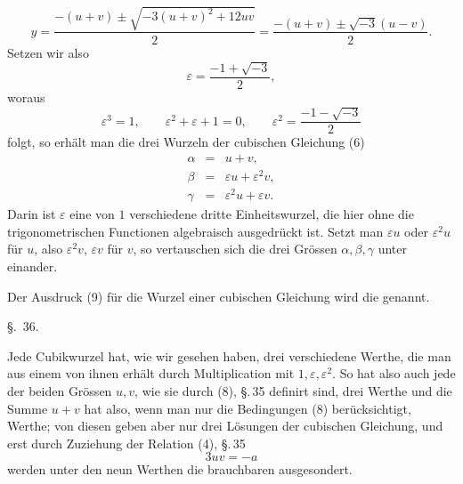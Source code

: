
\[
 y=\frac{-(u+v)\pm\sqrt{-3(u+v)^2+12uv}}{2}
  =\frac{-(u+v)\pm\sqrt{-3}(u-v)}{2}.
\]
Setzen wir also
\begin{equation}
\varepsilon=\frac{-1+\sqrt{-3}}{2},
\tag{11}
\end{equation}
woraus
\begin{equation}
\varepsilon^3=1,
\qquad \varepsilon^2+\varepsilon+1=0,
\qquad
\varepsilon^2=\frac{-1-\sqrt{-3}}{2}
\tag{12}
\end{equation}
folgt, so erhält man die drei Wurzeln der cubischen Gleichung (6)
\begin{equation}
\begin{array}{rcl}
\alpha&=&u+v,\\
\beta&=&\varepsilon u+\varepsilon^2v,\\
\gamma&=&\varepsilon^2u+\varepsilon v.
\end{array}
\tag{13}
\end{equation}
Darin ist $\varepsilon$ eine von $1$ verschiedene dritte Einheitswurzel, die hier ohne die trigonometrischen Functionen algebraisch ausgedrückt ist. Setzt man $\varepsilon u$ oder $\varepsilon^2u$ für $u$, also $\varepsilon^2v$, $\varepsilon v$ für $v$, so vertauschen sich die drei Grössen $\alpha,\beta,\gamma$ unter einander.

Der Ausdruck (9) für die Wurzel einer cubischen Gleichung wird die  genannt.

\begin{center}
{\large \S.\ 36.}

\vspace{0.5em}
{\large{}}
\end{center}

Jede Cubikwurzel hat, wie wir gesehen haben, drei verschiedene Werthe, die man aus einem von ihnen erhält durch Multiplication mit $1,\varepsilon,\varepsilon^2$. So hat also auch jede der beiden Grössen $u,v$, wie sie durch (8), \S.\,35 definirt sind, drei Werthe und die Summe $u+v$ hat also, wenn man nur die Bedingungen (8) berücksichtigt,  Werthe; von diesen geben aber nur drei Lösungen der cubischen Gleichung, und erst durch Zuziehung der Relation (4), \S.\,35
\begin{equation}
3uv=-a
\tag{1}
\end{equation}
werden unter den neun Werthen die brauchbaren ausgesondert.
